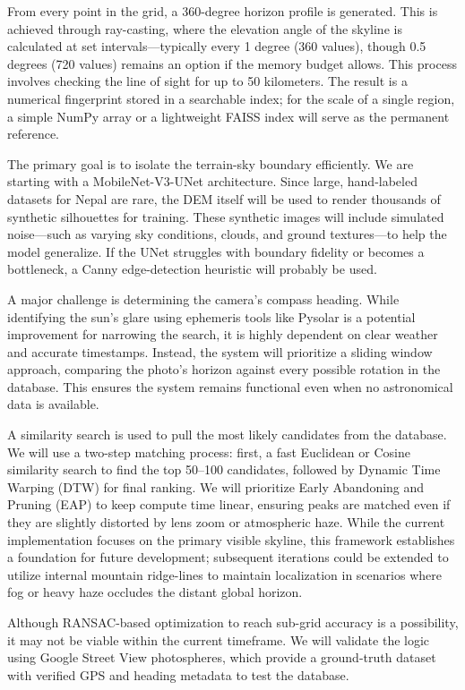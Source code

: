 From every point in the grid, a 360-degree horizon profile is generated. This is achieved through ray-casting, where the elevation angle of the skyline is calculated at set intervals---typically every 1 degree (360 values), though 0.5 degrees (720 values) remains an option if the memory budget allows. This process involves checking the line of sight for up to 50 kilometers. The result is a numerical fingerprint stored in a searchable index; for the scale of a single region, a simple NumPy array or a lightweight FAISS index will serve as the permanent reference.

The primary goal is to isolate the terrain-sky boundary efficiently. We are starting with a MobileNet-V3-UNet architecture. Since large, hand-labeled datasets for Nepal are rare, the DEM itself will be used to render thousands of synthetic silhouettes for training. These synthetic images will include simulated noise---such as varying sky conditions, clouds, and ground textures---to help the model generalize. If the UNet struggles with boundary fidelity or becomes a bottleneck, a Canny edge-detection heuristic will probably be used.

A major challenge is determining the camera’s compass heading. While identifying the sun’s glare using ephemeris tools like Pysolar is a potential improvement for narrowing the search, it is highly dependent on clear weather and accurate timestamps. Instead, the system will prioritize a sliding window approach, comparing the photo’s horizon against every possible rotation in the database. This ensures the system remains functional even when no astronomical data is available.

A similarity search is used to pull the most likely candidates from the database. We will use a two-step matching process: first, a fast Euclidean or Cosine similarity search to find the top 50--100 candidates, followed by Dynamic Time Warping (DTW) for final ranking. We will prioritize Early Abandoning and Pruning (EAP) to keep compute time linear, ensuring peaks are matched even if they are slightly distorted by lens zoom or atmospheric haze. While the current implementation focuses on the primary visible skyline, this framework establishes a foundation for future development; subsequent iterations could be extended to utilize internal mountain ridge-lines to maintain localization in scenarios where fog or heavy haze occludes the distant global horizon.

Although RANSAC-based optimization to reach sub-grid accuracy is a possibility, it may not be viable within the current timeframe. We will validate the logic using Google Street View photospheres, which provide a ground-truth dataset with verified GPS and heading metadata to test the database.
